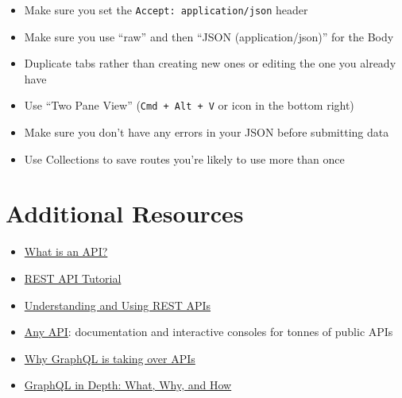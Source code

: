 \begin{itemize}[leftmargin=*]
    \item Make sure you set the \texttt{Accept: application/json} header


    \pagebreak

    \item Make sure you use ``raw'' and then ``JSON (application/json)'' for the Body


    \item Duplicate tabs rather than creating new ones or editing the one you already have


    \item Use ``Two Pane View'' (\texttt{Cmd + Alt + V} or icon in the bottom right)


    \item Make sure you don't have any errors in your JSON before submitting data


    \item Use Collections to save routes you're likely to use more than once
\end{itemize}



\section{Additional Resources}

\begin{itemize}[leftmargin=*]
    \item \href{https://www.howtogeek.com/343877/what-is-an-api/}{What is an API?}
    \item \href{https://restfulapi.net}{REST API Tutorial}
    \item \href{https://www.smashingmagazine.com/2018/01/understanding-using-rest-api/}{Understanding and Using REST APIs}
    \item \href{https://any-api.com}{Any API}: documentation and interactive consoles for tonnes of public APIs
    \item \href{https://webapplog.com/graphql/}{Why GraphQL is taking over APIs}
    \item \href{https://ponyfoo.com/articles/graphql-in-depth-what-why-and-how}{GraphQL in Depth: What, Why, and How}
\end{itemize}
